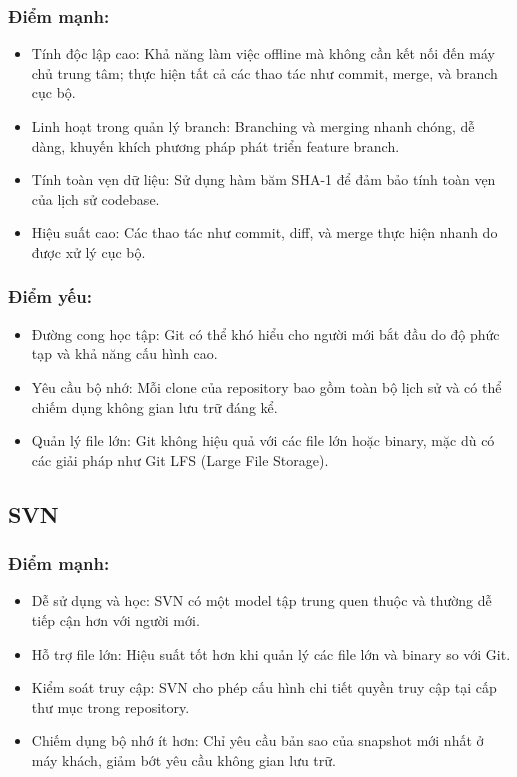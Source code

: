 \subsubsection{Điểm mạnh:}
\begin{itemize}
    \item Tính độc lập cao: Khả năng làm việc offline mà không cần kết nối đến máy chủ trung tâm; thực hiện tất cả các thao tác như commit, merge, và branch cục bộ.
    \item Linh hoạt trong quản lý branch: Branching và merging nhanh chóng, dễ dàng, khuyến khích phương pháp phát triển feature branch.
    \item Tính toàn vẹn dữ liệu: Sử dụng hàm băm SHA-1 để đảm bảo tính toàn vẹn của lịch sử codebase.
    \item Hiệu suất cao: Các thao tác như commit, diff, và merge thực hiện nhanh do được xử lý cục bộ.
\end{itemize}

\subsubsection{Điểm yếu:}
\begin{itemize}
    \item Đường cong học tập: Git có thể khó hiểu cho người mới bắt đầu do độ phức tạp và khả năng cấu hình cao.
    \item Yêu cầu bộ nhớ: Mỗi clone của repository bao gồm toàn bộ lịch sử và có thể chiếm dụng không gian lưu trữ đáng kể.
    \item Quản lý file lớn: Git không hiệu quả với các file lớn hoặc binary, mặc dù có các giải pháp như Git LFS (Large File Storage).
\end{itemize}

\subsection{SVN}
\subsubsection{Điểm mạnh:}
\begin{itemize}
    \item Dễ sử dụng và học: SVN có một model tập trung quen thuộc và thường dễ tiếp cận hơn với người mới.
    \item Hỗ trợ file lớn: Hiệu suất tốt hơn khi quản lý các file lớn và binary so với Git.
    \item Kiểm soát truy cập: SVN cho phép cấu hình chi tiết quyền truy cập tại cấp thư mục trong repository.
    \item Chiếm dụng bộ nhớ ít hơn: Chỉ yêu cầu bản sao của snapshot mới nhất ở máy khách, giảm bớt yêu cầu không gian lưu trữ.
\end{itemize}

